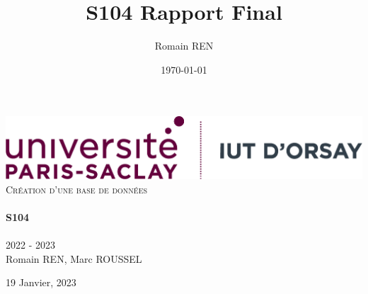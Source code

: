 \documentclass[12pt]{article}
\title{S104 Rapport Final}
\author{Romain REN}
\date{\today}
\begin{document}
    \pagestyle{fancy}
    \fancyhf{}
    
    \begin{titlepage}
    \vbox{ }

    \begin{center}
        \includegraphics[width=1\textwidth]{logo-iutorsay.png}\\[4cm]
        \textsc{\Large Création d'une base de données}\\[0.7cm]

        \noindent\makebox[\linewidth]{\rule{.7\paperwidth}{.6pt}}\\[0.7cm]
        { \huge \bfseries S104}\\[0.25cm]
        \noindent\makebox[\linewidth]{\rule{.7\paperwidth}{.6pt}}\\[0.7cm]
        \large{2022 - 2023}\\[1.2cm]
        \vfill
        \large
        Romain REN, Marc ROUSSEL

        {\large 19 Janvier, 2023}
    \end{center}
    \end{titlepage}
\end{document}
